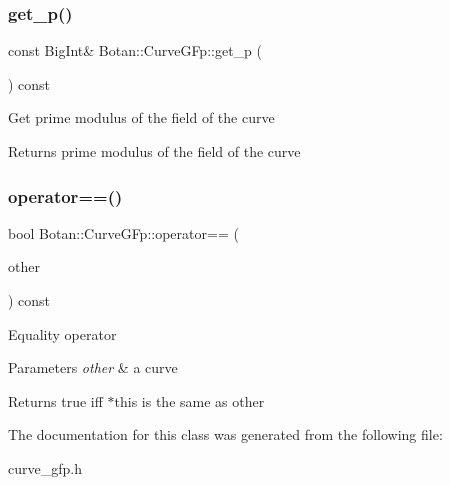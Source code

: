 \subsubsection{\texorpdfstring{get\+\_\+p()}{get\_p()}}
{\footnotesize\ttfamily const Big\+Int\& Botan\+::\+Curve\+G\+Fp\+::get\+\_\+p (\begin{DoxyParamCaption}{ }\end{DoxyParamCaption}) const\hspace{0.3cm}{\ttfamily [inline]}}

Get prime modulus of the field of the curve \begin{DoxyReturn}{Returns}
prime modulus of the field of the curve 
\end{DoxyReturn}
\mbox{\label{class_botan_1_1_curve_g_fp_adf896804903ce76835069b5d51aeb161}} 
\subsubsection{\texorpdfstring{operator==()}{operator==()}}
{\footnotesize\ttfamily bool Botan\+::\+Curve\+G\+Fp\+::operator== (\begin{DoxyParamCaption}\item[{const \hyperlink{class_botan_1_1_curve_g_fp}{Curve\+G\+Fp} \&}]{other }\end{DoxyParamCaption}) const\hspace{0.3cm}{\ttfamily [inline]}}

Equality operator 
\begin{DoxyParams}{Parameters}
{\em other} & a curve \\
\hline
\end{DoxyParams}
\begin{DoxyReturn}{Returns}
true iff $\ast$this is the same as other 
\end{DoxyReturn}


The documentation for this class was generated from the following file\+:\begin{DoxyCompactItemize}
\item 
curve\+\_\+gfp.\+h\end{DoxyCompactItemize}
